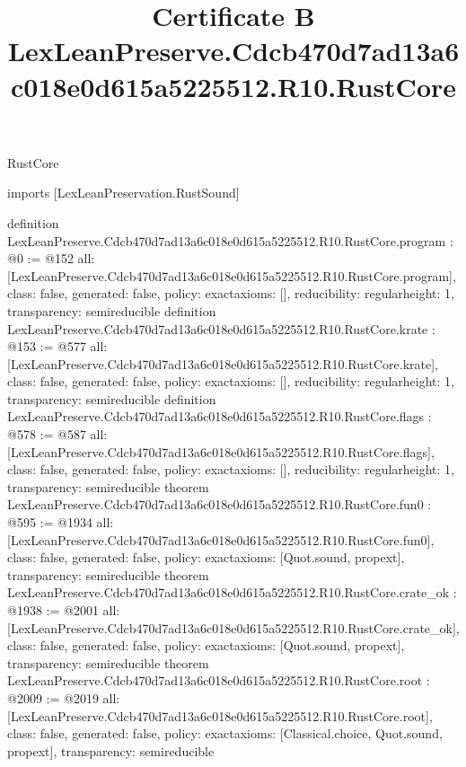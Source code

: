 \begin{lexlean}{RustCore}
\title{Certificate B LexLeanPreserve.Cdcb470d7ad13a6c018e0d615a5225512.R10.RustCore}
\begin{coremodule}
imports [LexLeanPreservation.RustSound]

definition LexLeanPreserve.Cdcb470d7ad13a6c018e0d615a5225512.R10.RustCore.program : @0 := @152 {
  all: [LexLeanPreserve.Cdcb470d7ad13a6c018e0d615a5225512.R10.RustCore.program],
  class: false,
  generated: false,
  policy: exact{axioms: []},
  reducibility: regular{height: 1},
  transparency: semireducible
}
definition LexLeanPreserve.Cdcb470d7ad13a6c018e0d615a5225512.R10.RustCore.krate : @153 := @577 {
  all: [LexLeanPreserve.Cdcb470d7ad13a6c018e0d615a5225512.R10.RustCore.krate],
  class: false,
  generated: false,
  policy: exact{axioms: []},
  reducibility: regular{height: 1},
  transparency: semireducible
}
definition LexLeanPreserve.Cdcb470d7ad13a6c018e0d615a5225512.R10.RustCore.flags : @578 := @587 {
  all: [LexLeanPreserve.Cdcb470d7ad13a6c018e0d615a5225512.R10.RustCore.flags],
  class: false,
  generated: false,
  policy: exact{axioms: []},
  reducibility: regular{height: 1},
  transparency: semireducible
}
theorem LexLeanPreserve.Cdcb470d7ad13a6c018e0d615a5225512.R10.RustCore.fun0 : @595 := @1934 {
  all: [LexLeanPreserve.Cdcb470d7ad13a6c018e0d615a5225512.R10.RustCore.fun0],
  class: false,
  generated: false,
  policy: exact{axioms: [Quot.sound, propext]},
  transparency: semireducible
}
theorem LexLeanPreserve.Cdcb470d7ad13a6c018e0d615a5225512.R10.RustCore.crate_ok : @1938 := @2001 {
  all: [LexLeanPreserve.Cdcb470d7ad13a6c018e0d615a5225512.R10.RustCore.crate_ok],
  class: false,
  generated: false,
  policy: exact{axioms: [Quot.sound, propext]},
  transparency: semireducible
}
theorem LexLeanPreserve.Cdcb470d7ad13a6c018e0d615a5225512.R10.RustCore.root : @2009 := @2019 {
  all: [LexLeanPreserve.Cdcb470d7ad13a6c018e0d615a5225512.R10.RustCore.root],
  class: false,
  generated: false,
  policy: exact{axioms: [Classical.choice, Quot.sound, propext]},
  transparency: semireducible
}


\end{coremodule}
\end{lexlean}
